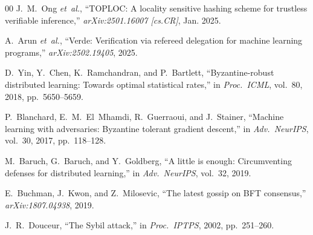 \documentclass[conference]{IEEEtran}
\begin{document}
\begin{thebibliography}{00}
J.~M.~Ong \emph{et~al.}, ``TOPLOC: A locality sensitive hashing scheme for trustless verifiable inference,'' \emph{arXiv:2501.16007 [cs.CR]}, Jan. 2025.

A.~Arun \emph{et~al.}, ``Verde: Verification via refereed delegation for machine learning programs,'' \emph{arXiv:2502.19405}, 2025.

D.~Yin, Y.~Chen, K.~Ramchandran, and P.~Bartlett, ``Byzantine-robust distributed learning: Towards optimal statistical rates,'' in \emph{Proc.\ ICML}, vol.~80, 2018, pp.~5650--5659.

P.~Blanchard, E.~M.~El~Mhamdi, R.~Guerraoui, and J.~Stainer, ``Machine learning with adversaries: Byzantine tolerant gradient descent,'' in \emph{Adv.\ NeurIPS}, vol.~30, 2017, pp.~118--128.

M.~Baruch, G.~Baruch, and Y.~Goldberg, ``A little is enough: Circumventing defenses for distributed learning,'' in \emph{Adv.\ NeurIPS}, vol.~32, 2019.

E.~Buchman, J.~Kwon, and Z.~Milosevic, ``The latest gossip on BFT consensus,'' \emph{arXiv:1807.04938}, 2019.

J.~R.~Douceur, ``The Sybil attack,'' in \emph{Proc.\ IPTPS}, 2002, pp.~251--260.

\end{thebibliography}
\end{document}
